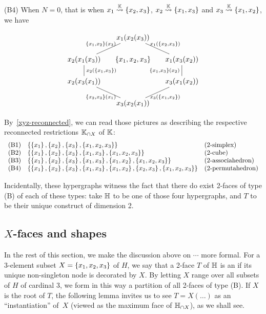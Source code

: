 \smallskip\noindent
(B4) When $N=0$, that is when $x_1\stackrel{{\mathbb K}}{\rightsquigarrow}\left\{x_2,x_3\right\}$, $x_2\stackrel{{\mathbb K}}{\rightsquigarrow}\left\{x_1,x_3\right\}$ and
 $x_3\stackrel{{\mathbb K}}{\rightsquigarrow}\left\{x_1,x_2\right\}$, we have
 
 $$\xymatrix @-1.65pc {&& x_1(x_2(x_3)) \ar @{-}[ddll]_{\set{x_1,x_2}(x_3)} \ar @{-}[ddrr]^{x_1(\set{x_2,x_3})}&& \\
 &&&&\\
 x_2(x_1(x_3)) \ar @{-}[dd]^{x_2(\set{x_1,x_3})}&& \set{x_1,x_2,x_3} && x_1(x_3(x_2))\ar @{-}[dd]_{\set{x_1,x_3}(x_2)}\\
 &&  &&\\
 x_2(x_3(x_1)) \ar @{-}[ddrr]_{\set{x_2,x_3}(x_1)} &&  && \ar @{-}[ddll]^{x_3(\set{x_1,x_2})} x_3(x_1(x_2))\\
 &&&&\\
 &&  x_3(x_2(x_1))&&}
$$

By~\cref{xyz-reconnected}, we can read those pictures as describing the 
respective reconnected restrictions ${\mathbb K}_{\cap X}$ of ${\mathbb K}$:
$$\begin{array}{lll}
\mathrm{(B1)} & \left\{\left\{x_1\right\},\left\{x_2\right\},\left\{x_3\right\},\left\{x_1,x_2,x_3\right\}\right\} & \mbox{(2-simplex)}\\
\mathrm{(B2)} & \left\{\left\{x_1\right\},\left\{x_2\right\},\left\{x_3\right\},\left\{x_1,x_3\right\},\left\{x_1,x_2,x_3\right\}\right\} & \mbox{(2-cube})\\
\mathrm{(B3)} & \left\{\left\{x_1\right\},\left\{x_2\right\},\left\{x_3\right\},\left\{x_1,x_3\right\},\left\{x_1,x_2\right\},\left\{x_1,x_2,x_3\right\}\right\} & \mbox{(2-associahedron)}\\
\mathrm{(B4)} & \left\{\left\{x_1\right\},\left\{x_2\right\},\left\{x_3\right\},\left\{x_1,x_3\right\},\left\{x_1,x_2\right\},\left\{x_2,x_3\right\},\left\{x_1,x_2,x_3\right\}\right\} & \mbox{(2-permutahedron)}
\end{array}$$

Incidentally, these  hypergraphs witness the fact that there do exist 2-faces of type (B) of  each  of these types: take ${\mathbb H}$ to be one of those four hypergraphs, and $T$ to be their unique construct of dimension 2.


\subsection{$X$-faces and shapes}

In the rest of this section, we make the discussion above on $\cdots$ more formal.
For a 3-element subset $X=\left\{x_1,x_2,x_3\right\}$ of $H$, we say that a 2-face $T$ of ${\mathbb H}$ is an  if its unique non-singleton node is decorated by $X$.  By letting $X$ range over all subsets of $H$ of cardinal 3, we form in this way a partition of all 2-faces of type (B).
If $X$ is the root of $T$, the following  lemma invites us to see $T=X(\ldots)$ as an ``instantiation'' of~$X$ (viewed as the maximum face of ${\mathbb H}_{\cap X}$), as we shall see.

